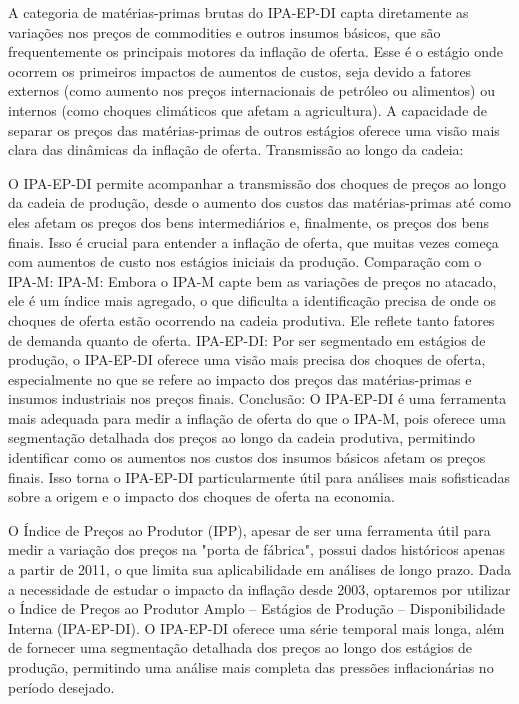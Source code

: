 \documentclass[12pt,oneside,a4paper,chapter=TITLE,english,brazil,sumario=abnt-6027-2012]{abntex2}
\begin{document}
A categoria de matérias-primas brutas do IPA-EP-DI capta diretamente as variações nos preços de commodities e outros insumos básicos, que são frequentemente os principais motores da inflação de oferta. Esse é o estágio onde ocorrem os primeiros impactos de aumentos de custos, seja devido a fatores externos (como aumento nos preços internacionais de petróleo ou alimentos) ou internos (como choques climáticos que afetam a agricultura).
A capacidade de separar os preços das matérias-primas de outros estágios oferece uma visão mais clara das dinâmicas da inflação de oferta.
Transmissão ao longo da cadeia:

O IPA-EP-DI permite acompanhar a transmissão dos choques de preços ao longo da cadeia de produção, desde o aumento dos custos das matérias-primas até como eles afetam os preços dos bens intermediários e, finalmente, os preços dos bens finais. Isso é crucial para entender a inflação de oferta, que muitas vezes começa com aumentos de custo nos estágios iniciais da produção.
Comparação com o IPA-M:
IPA-M: Embora o IPA-M capte bem as variações de preços no atacado, ele é um índice mais agregado, o que dificulta a identificação precisa de onde os choques de oferta estão ocorrendo na cadeia produtiva. Ele reflete tanto fatores de demanda quanto de oferta.
IPA-EP-DI: Por ser segmentado em estágios de produção, o IPA-EP-DI oferece uma visão mais precisa dos choques de oferta, especialmente no que se refere ao impacto dos preços das matérias-primas e insumos industriais nos preços finais.
Conclusão:
O IPA-EP-DI é uma ferramenta mais adequada para medir a inflação de oferta do que o IPA-M, pois oferece uma segmentação detalhada dos preços ao longo da cadeia produtiva, permitindo identificar como os aumentos nos custos dos insumos básicos afetam os preços finais. Isso torna o IPA-EP-DI particularmente útil para análises mais sofisticadas sobre a origem e o impacto dos choques de oferta na economia.

O Índice de Preços ao Produtor (IPP), apesar de ser uma ferramenta útil para medir a variação dos preços na "porta de fábrica", possui dados históricos apenas a partir de 2011, o que limita sua aplicabilidade em análises de longo prazo. Dada a necessidade de estudar o impacto da inflação desde 2003, optaremos por utilizar o Índice de Preços ao Produtor Amplo – Estágios de Produção – Disponibilidade Interna (IPA-EP-DI). O IPA-EP-DI oferece uma série temporal mais longa, além de fornecer uma segmentação detalhada dos preços ao longo dos estágios de produção, permitindo uma análise mais completa das pressões inflacionárias no período desejado.
\end{document}
